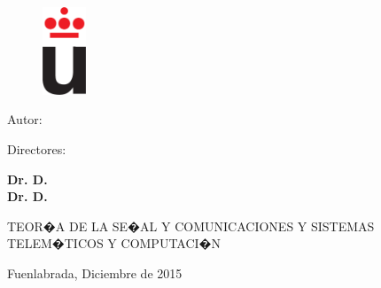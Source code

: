 
\begin{center}

\thispagestyle{empty} %
\begin{figure}[h]
\centering
	\includegraphics[width=1.3cm]{images/logo_URJC.eps} \label{figure:HS2ant}
	\vspace{-0.5cm}
\end{figure}



{\large \universidad} %





\vfill {\LARGE\bf \nombreDoc }\vspace{0.5cm}

{\Large\bf \textsc \tituloDoc }

\vspace{2cm}

{\large Autor:}

{\large\bf \autorDoc}\vspace{1cm}


Directores:

{\large\bf Dr. D. \directorDocA}
\\ {\large\bf Dr. D. \directorDocB}


\vspace{1cm}


\vspace*{1cm} {TEOR�A DE LA SE�AL Y COMUNICACIONES Y SISTEMAS TELEM�TICOS Y COMPUTACI�N}\vspace{1cm}

\large{Fuenlabrada, Diciembre de 2015}
\end{center}
\vspace{2cm}
\clearpage
